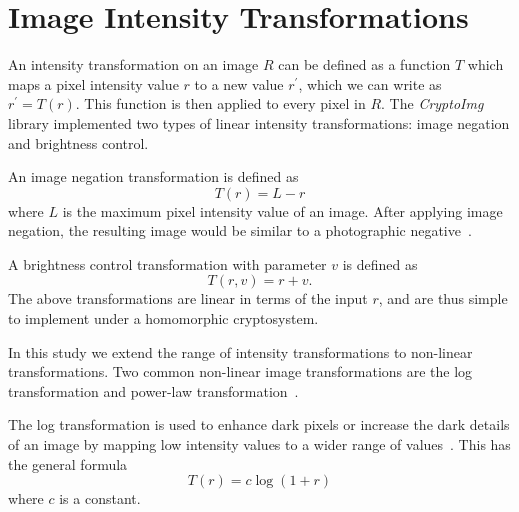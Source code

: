 
\section{Image Intensity Transformations}
An intensity transformation on an image $R$ can be defined as a function $T$ which maps a pixel intensity value $r$ to a new value $r^\prime$, which we can write as $r^\prime = T\left(r\right)$. This function is then applied to every pixel in $R$.
The \textit{CryptoImg} library implemented two types of linear intensity transformations: image negation and brightness control.

An image negation transformation is defined as
\begin{equation}
    T\left(r\right) = L-r
\end{equation}
where $L$ is the maximum pixel intensity value of an image.
After applying image negation, the resulting image would be similar to a photographic negative~\cite{gonzalez_digital_2008}.

A brightness control transformation with parameter $v$ is defined as
\begin{equation}
    T\left(r,v\right) = r+v.
\end{equation}
The above transformations are linear in terms of the input $r$, and are thus simple to implement under a homomorphic cryptosystem.

In this study we extend the range of intensity transformations to non-linear transformations. Two common non-linear image transformations are the log transformation and power-law transformation~\cite{gonzalez_digital_2008}.

The log transformation is used to enhance dark pixels or increase the dark details of an image by mapping low intensity values to a wider range of values~\cite{gonzalez_digital_2008}. This has the general formula
\begin{equation}
    T\left(r\right) = c \log\left(1 + r\right)
\end{equation}
where $c$ is a constant.

